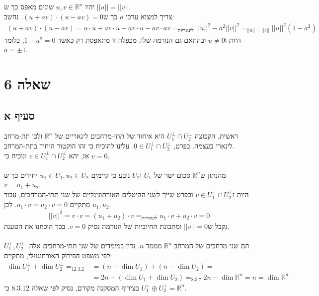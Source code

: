 \documentclass{article}
\DeclareMathOperator*{\equals}{=}
\def\reals{\mathbb{R}}
\def\zerovec{\underline{0}}
\begin{document}
יהיו $u,v\in \reals^n$ שונים מאפס כך ש $||u||=||v||$. \\
צריך למצוא ערכי $a$ כך ש$(u+av)\cdot (u-av)=0$. נחשב:
\begin{align*}
    (u+av)\cdot (u-av) =
    u\cdot u + av \cdot u - av \cdot u - av \cdot av \equals_{\text{לינאריות}}
    ||u||^2 - a^2||v||^2\equals_{||u||=||v||}
    ||u||^2(1-a^2)
\end{align*}
היות ו$u\ne 0$ ובהתאם גם הנורמה שלו, מכפלה זו מתאפסת רק כאשר $1-a^2=0$, כלומר $a=\pm 1$.

\section{שאלה 6}

\subsection*{סעיף א}

ראשית, הקבוצה $U_1^\perp\cap U_2^\perp$ היא איחוד של תתי-מרחבים לינאריים של $\reals^n$ ולכן תת-מרחב לינארי בעצמה. בפרט, $\zerovec \in U_1^\perp\cap U_2^\perp$. עלינו להוכיח כי זהו הוקטור היחיד בתת-המרחב. \\
אז, יהא $v\in U_1^\perp\cap U_2^\perp$ ונוכיח כי $v=0$.
\\\\
מהנתון ש$\reals^n$ סכום ישר של $U_1$ ו$U_2$ נובע כי קיימים $u_1\in U_1, u_2\in U_2$ יחידים כך ש $v=u_1+u_2$.\\
היות ו$v\in U_1^\perp\cap U_2^\perp$ ובפרט שייך לשני ההיטלים האורתוגינליים של שני תתי-המרחבים, עבור $u_1, u_2$ מתקיים $u_1\cdot v= u_2\cdot v= 0$. לכן,
\begin{align*}
    ||v||^2=v \cdot v = (u_1+u_2)\cdot v \equals_{\text{לינאריות}}u_1\cdot v + u_2\cdot v = 0
\end{align*}
נקבל ש$||v||=0$ ומתכונת החיוביות של הנורמה נסיק $v=0$. בכך הוכחנו את הטענה.
\\\\
$U_1^\perp, U_2^\perp$ הם שני מרחבים של המרחב $\reals^n$ מממד $n$. נדון במימדים של שני תתי-מרחבים אלה. לפי משפט הפירוק האורתוגונלי, מתקיים:
\begin{align*}
    \dim U_1^\perp + \dim U_2^\perp \equals_{12.3.2} & = (n-\dim U_1) + (n-\dim U_2) =                                                 \\
                                                     & = 2n - (\dim U_1+\dim U_2) \equals_{8.3.7} 2n-\dim \reals^n = n = \dim \reals^n
\end{align*}
בצירוף המסקנה מקודם, נסיק לפי שאלה 8.3.12 כי $U_1^\perp\oplus U_2^\perp=\reals^n$.
\end{document}
